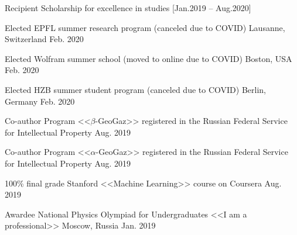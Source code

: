 
\begin{cvhonors}

  \cvhonor
    {Recipient} %
    {Scholarship for excellence in studies} %
    {} %
    {[Jan.2019 -- Aug.2020]} %
    
  \cvhonor
    {Elected} %
    {EPFL summer research program (canceled due to COVID)} %
    {Lausanne, Switzerland} %
    {Feb. 2020} %
    
  \cvhonor
    {Elected} %
    {Wolfram summer school (moved to online due to COVID)} %
    {Boston, USA} %
    {Feb. 2020} %
    
  \cvhonor
    {Elected} %
    {HZB summer student program (canceled due to COVID)} %
    {Berlin, Germany} %
    {Feb. 2020} %
    
  \cvhonor
    {Co-author} %
    {Program <<$\beta$-GeoGaz>> registered in the Russian Federal Service for Intellectual Property} %
    {} %
    {Aug. 2019} %
            
  \cvhonor
    {Co-author} %
    {Program <<$\alpha$-GeoGaz>> registered in the Russian Federal Service for Intellectual Property} %
    {} %
    {Aug. 2019} %
    
  \cvhonor
    {100\% final grade} %
    {Stanford <<Machine Learning>> course on Coursera} %
    {} %
    {Aug. 2019} %
    
  \cvhonor
    {Awardee} %
    {National Physics Olympiad for Undergraduates <<I am a professional>>} %
    {Moscow, Russia} %
    {Jan. 2019} %
    

\end{cvhonors}
